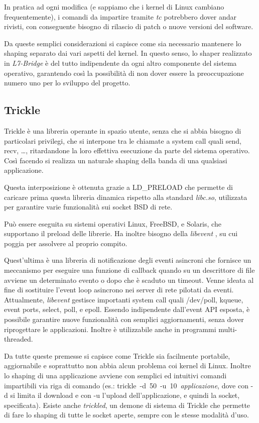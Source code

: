 In pratica ad ogni modifica (e sappiamo che i kernel di Linux cambiano frequentemente), i comandi da impartire tramite \emph{tc} potrebbero dover andar rivisti, con conseguente bisogno di rilascio di patch o nuove versioni del software.

Da queste semplici considerazioni si capisce come sia necessario mantenere lo shaping separato dai vari aspetti del kernel. In questo senso, lo shaper realizzato in \emph{L7-Bridge} è del tutto indipendente da ogni altro componente del sistema operativo, garantendo così la possibilità di non dover essere la preoccupazione numero uno per lo sviluppo del progetto.

\subsection{Trickle}

Trickle \cite{trickle} è una libreria operante in spazio utente, senza che si abbia bisogno di particolari privilegi, che si interpone tra le chiamate a system call quali send, recv, \dots, ritardandone la loro effettiva esecuzione da parte del sistema operativo. Così facendo si realizza un naturale shaping della banda di una qualsiasi applicazione.

Questa interposizione è ottenuta grazie a LD\_PRELOAD che permette di caricare prima questa libreria dinamica rispetto alla standard \emph{libc.so}, utilizzata per garantire varie funzionalità sui socket BSD di rete.

Può essere eseguita su sistemi operativi Linux, FreeBSD, e Solaris, che supportano il preload delle librerie. Ha inoltre bisogno della \emph{libevent} \cite{libevent}, su cui poggia per assolvere al proprio compito.

Quest'ultima è una libreria di notificazione degli eventi asincroni che fornisce un meccanismo per eseguire una funzione di callback quando su un descrittore di file avviene un determinato evento o dopo che è scaduto un timeout. Venne ideata al fine di sostituire l'event loop asincrono nei server di rete pilotati da eventi. Attualmente, \emph{libevent} gestisce importanti system call quali /dev/poll, kqueue, event ports, select, poll, e epoll. Essendo indipendente dall'event API esposta, è possibile garantire nuove funzionalità con semplici aggiornamenti, senza dover riprogettare le applicazioni. Inoltre è utilizzabile anche in programmi multi-threaded.

Da tutte queste premesse si capisce come Trickle sia facilmente portabile, aggiornabile e soprattutto non abbia alcun problema coi kernel di Linux. Inoltre lo shaping di una applicazione avviene con semplici ed intuitivi comandi impartibili via riga di comando (es.: \mbox{trickle -d 50 -u 10 \emph{applicazione},} dove con -d si limita il download e con -u l'upload dell'applicazione, e quindi la socket, specificata). Esiste anche \emph{trickled}, un demone di sistema di Trickle che permette di fare lo shaping di tutte le socket aperte, sempre con le stesse modalità d'uso.


